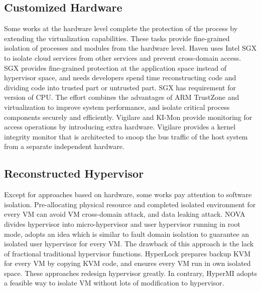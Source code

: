 \documentclass[conference]{IEEEtran}
\begin{document}
\subsection{Customized Hardware }
Some works at the hardware level complete the protection of the process by extending the virtualization capabilities. These tasks provide fine-grained isolation of processes and modules from the hardware level. Haven \cite{haven} uses Intel SGX\cite{Hoekstra13cuvillo,Mckeen2013Innovative} to isolate cloud services from other services and prevent cross-domain access. SGX provides fine-grained protection at the application space instead of hypervisor space, and needs developers spend time reconstructing code and dividing code into trusted part or untrusted part. SGX has requirement for version of CPU. The effort \cite{Cho2016Hardware} combines the advantages of ARM TrustZone and virtualization to improve system performance, and isolate critical process components securely and efficiently.
 Vigilare\cite{Moon2012Vigilare} and KI-Mon \cite{Lee2013KI} provide monitoring for access operations by introducing extra hardware. Vigilare provides a kernel integrity monitor that is architected to snoop the bus traffic of the host system from a separate independent hardware.

\subsection{Reconstructed Hypervisor }
Except for approaches based on hardware, some works\cite{nexen,Steinberg2010NOVA,hyperlock} pay attention to software isolation. Pre-allocating physical resource and completed isolated environment for every VM can avoid VM cross-domain attack, and data leaking attack. NOVA\cite{Steinberg2010NOVA} divides hypervisor into micro-hypervisor and user hypervisor running in root mode, adopts an idea which is similar to fault domain isolation to guarantee an isolated user hypervisor for every VM. The drawback of this approach is the lack of fractional traditional hypervisor functions. HyperLock \cite{hyperlock} prepares backup KVM for every VM by copying KVM code, and ensures every VM run in own isolated space. 
These approaches redesign hypervisor greatly. In contrary, HyperMI adopts a feasible way to isolate VM without lots of modification to hypervisor. 
\end{document}
